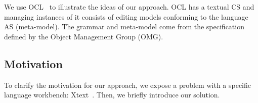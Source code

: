 \documentclass{llncs}
\begin{document}
We use OCL~\cite{omg2014ocl} to illustrate the ideas of our approach. OCL has a textual CS and managing instances of it consists of editing models conforming to the language AS (meta-model). The grammar and meta-model come from the specification defined by the Object Management Group (OMG).



\subsection{Motivation}
\label{subsec:motivation}

To clarify the motivation for our approach, we expose a problem with a specific language workbench: Xtext~\cite{eysholdt2010Xtext}. Then, we briefly introduce our solution.




\end{document}

